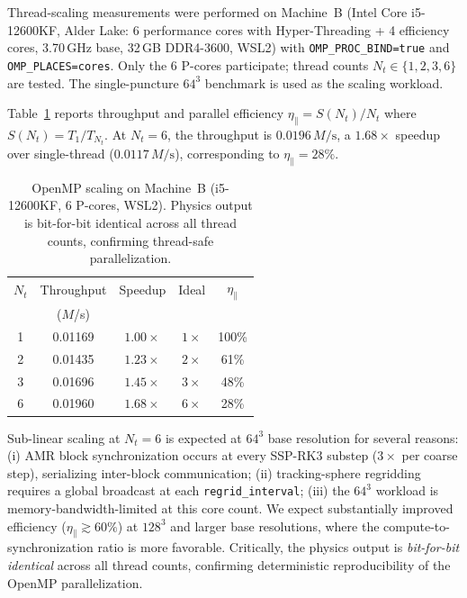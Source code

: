 \documentclass[aps,prd,twocolumn,superscriptaddress,nofootinbib,showpacs,
               longbibliography]{revtex4-2}
\newcommand{\code}[1]{\texttt{#1}}
\begin{document}
Thread-scaling measurements were performed on Machine~B (Intel Core
i5-12600KF, Alder Lake: 6 performance cores with Hyper-Threading + 4
efficiency cores, 3.70\,GHz base, 32\,GB DDR4-3600, WSL2) with
\code{OMP\_PROC\_BIND=true} and \code{OMP\_PLACES=cores}.
Only the 6 P-cores participate; thread counts $N_t \in \{1,2,3,6\}$ are tested.
The single-puncture $64^3$ benchmark is used as the scaling workload.

Table~\ref{tab:scaling} reports throughput and parallel efficiency
$\eta_\parallel = S(N_t)/N_t$ where $S(N_t) = T_1/T_{N_t}$.
At $N_t = 6$, the throughput is $0.0196\,M/\text{s}$, a $1.68\times$
speedup over single-thread ($0.0117\,M/\text{s}$), corresponding to
$\eta_\parallel = 28\%$.

\begin{table}[t]
\caption{OpenMP scaling on Machine~B (i5-12600KF, 6 P-cores, WSL2).
  Physics output is bit-for-bit identical across all thread counts,
  confirming thread-safe parallelization.}
\label{tab:scaling}
\begin{ruledtabular}
\begin{tabular}{ccccc}
  $N_t$ & Throughput & Speedup & Ideal & $\eta_\parallel$ \\
        & ($M$/s) & & & \\ \hline
  1 & 0.01169 & $1.00\times$ & $1\times$ & 100\% \\
  2 & 0.01435 & $1.23\times$ & $2\times$ & 61\% \\
  3 & 0.01696 & $1.45\times$ & $3\times$ & 48\% \\
  6 & 0.01960 & $1.68\times$ & $6\times$ & 28\% \\
\end{tabular}
\end{ruledtabular}
\end{table}

Sub-linear scaling at $N_t = 6$ is expected at $64^3$ base resolution for
several reasons:
(i) AMR block synchronization occurs at every SSP-RK3 substep ($3\times$
per coarse step), serializing inter-block communication;
(ii) tracking-sphere regridding requires a global broadcast at each
\code{regrid\_interval};
(iii) the $64^3$ workload is memory-bandwidth-limited at this core count.
We expect substantially improved efficiency ($\eta_\parallel \gtrsim 60\%$)
at $128^3$ and larger base resolutions, where the compute-to-synchronization
ratio is more favorable.
Critically, the physics output is \emph{bit-for-bit identical} across all
thread counts, confirming deterministic reproducibility of the OpenMP
parallelization.
\end{document}
